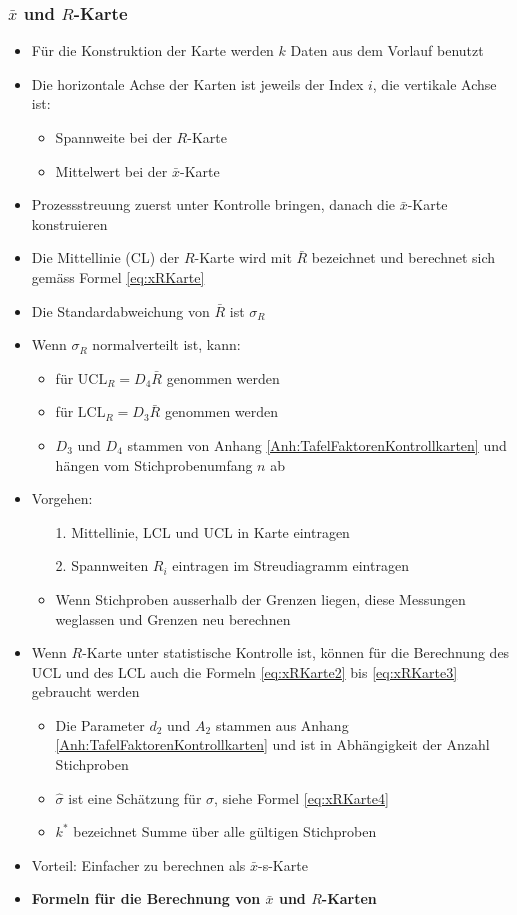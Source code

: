 \subsubsection{$\bar{x}$ und $R$-Karte}
\begin{itemize}
	\item Für die Konstruktion der Karte werden $k$ Daten aus dem Vorlauf benutzt
	\item Die horizontale Achse der Karten ist jeweils der Index $i$, die vertikale Achse ist: 
	\begin{itemize}
		\item Spannweite bei der $R$-Karte
		\item Mittelwert bei der $\bar{x}$-Karte
	\end{itemize}
	\item Prozessstreuung zuerst unter Kontrolle bringen, danach die $\bar{x}$-Karte konstruieren
	\item Die Mittellinie (CL) der $R$-Karte wird mit $\bar{R}$ bezeichnet und berechnet sich gemäss Formel \ref{eq:xRKarte}
	\item Die Standardabweichung von $\bar{R}$ ist $\sigma_R$
	\item Wenn $\sigma_R$ normalverteilt ist, kann:
	\begin{itemize}
		\item für $\text{UCL}_R = D_4\bar{R}$ genommen werden
		\item für $\text{LCL}_R = D_3\bar{R}$ genommen werden
		\item $D_3$ und $D_4$ stammen von Anhang \ref{Anh:TafelFaktorenKontrollkarten} und hängen vom Stichprobenumfang $n$ ab
	\end{itemize}
	\item Vorgehen:
	\begin{itemize}
		\item [1.] Mittellinie, LCL und UCL in Karte eintragen
		\item [2.] Spannweiten $R_i$ eintragen im Streudiagramm eintragen
		\item Wenn Stichproben ausserhalb der Grenzen liegen, diese Messungen weglassen und Grenzen neu berechnen
	\end{itemize}
	\item Wenn $R$-Karte unter statistische Kontrolle ist, können für die Berechnung des UCL und des LCL auch die Formeln \ref{eq:xRKarte2} bis \ref{eq:xRKarte3} gebraucht werden
	\begin{itemize}
		\item Die Parameter $d_2$ und $A_2$ stammen aus Anhang \ref{Anh:TafelFaktorenKontrollkarten} und ist in Abhängigkeit der Anzahl Stichproben
		\item $\hat{\sigma}$ ist eine Schätzung für $\sigma$, siehe Formel \ref{eq:xRKarte4}
		\item $k^\ast$ bezeichnet Summe über alle gültigen Stichproben
	\end{itemize}
	\item Vorteil: Einfacher zu berechnen als $\bar{x}$-s-Karte
	\item \textbf{Formeln für die Berechnung von $\bar{x}$ und $R$-Karten}
\end{itemize}
